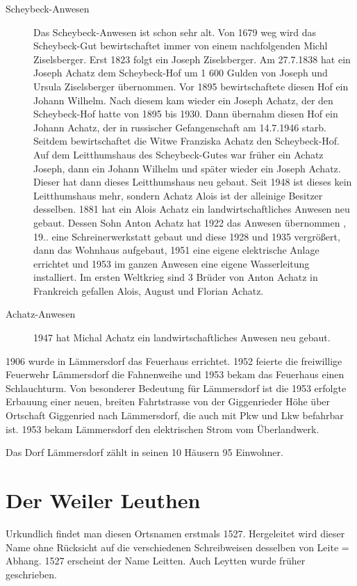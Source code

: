 \documentclass{book}
\begin{document}
\begin{description}
\item[Scheybeck-Anwesen] Das Scheybeck-Anwesen ist schon sehr alt. Von
1679 weg wird das Scheybeck-Gut bewirtschaftet immer von einem
nachfolgenden Michl Ziselsberger. Erst 1823 folgt ein Joseph
Ziselsberger. Am 27.7.1838 hat ein Joseph Achatz dem Scheybeck-Hof um 1
600 Gulden von Joseph und Ursula Ziselsberger übernommen. Vor 1895
bewirtschaftete diesen Hof ein Johann Wilhelm. Nach diesem kam wieder
ein Joseph Achatz, der den Scheybeck-Hof hatte von 1895 bis 1930. Dann
übernahm diesen Hof ein Johann Achatz, der in russischer Gefangenschaft
am 14.7.1946 starb. Seitdem bewirtschaftet die Witwe Franziska Achatz
den Scheybeck-Hof. Auf dem Leitthumshaus des Scheybeck-Gutes war früher
ein Achatz Joseph, dann ein Johann Wilhelm und später wieder ein Joseph
Achatz. Dieser hat dann dieses Leitthumshaus neu gebaut. Seit 1948 ist
dieses kein Leitthumshaus mehr, sondern Achatz Alois ist der alleinige
Besitzer desselben. 1881 hat ein Alois Achatz ein landwirtschaftliches
Anwesen neu gebaut. Dessen Sohn Anton Achatz hat 1922 das Anwesen
übernommen , 19.. eine Schreinerwerkstatt gebaut und diese 1928 und 1935
vergrößert, dann das Wohnhaus aufgebaut, 1951 eine eigene elektrische
Anlage errichtet und 1953 im ganzen Anwesen eine eigene Wasserleitung
installiert. Im ersten Weltkrieg sind 3 Brüder von Anton Achatz in
Frankreich gefallen Alois, August und Florian Achatz.

\item[Achatz-Anwesen] 1947 hat Michal Achatz ein landwirtschaftliches
Anwesen neu gebaut.
\end{description}

1906 wurde in Lämmersdorf das Feuerhaus errichtet. 1952 feierte die
freiwillige Feuerwehr Lämmersdorf die Fahnenweihe und 1953 bekam das
Feuerhaus einen Schlauchturm. Von besonderer Bedeutung für Lämmersdorf
ist die 1953 erfolgte Erbauung einer neuen, breiten Fahrtstrasse von der
Giggenrieder Höhe über Ortschaft Giggenried nach Lämmersdorf, die auch
mit Pkw und Lkw befahrbar ist. 1953 bekam Lämmersdorf den elektrischen
Strom vom Überlandwerk.

Das Dorf Lämmersdorf zählt in seinen 10 Häusern 95 Einwohner.

\section{Der Weiler Leuthen}

Urkundlich findet man diesen Ortsnamen erstmals 1527. Hergeleitet wird
dieser Name ohne Rücksicht auf die verschiedenen Schreibweisen desselben
von Leite = Abhang. 1527 erscheint der Name Leitten. Auch Leytten wurde
früher geschrieben.
\end{document}
